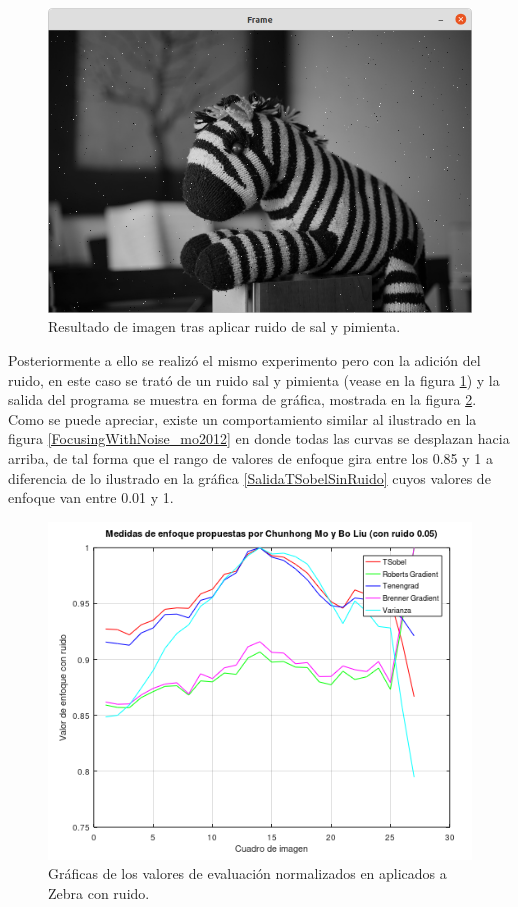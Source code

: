 \begin{figure}
\centering
\includegraphics[width=\textwidth]{GraficosExperimentacion/CebraConRuidoFOCUS.png}
\caption{Resultado de imagen tras aplicar ruido de sal y pimienta.}
\label{cebraRuido}
\end{figure}

Posteriormente a ello se realizó el mismo experimento pero con la adición del ruido, en este caso se trató de un ruido sal y pimienta (vease en la figura \ref{cebraRuido}) y la salida del programa se muestra en forma de gráfica, mostrada en la figura \ref{SalidaTSobelConRuido}. Como se puede apreciar, existe un comportamiento similar al ilustrado en la figura \ref{FocusingWithNoise_mo2012} en donde todas las curvas se desplazan hacia arriba, de tal forma que el rango de valores de enfoque gira entre los 0.85 y 1 a diferencia de lo ilustrado en la gráfica \ref{SalidaTSobelSinRuido} cuyos valores de enfoque van entre 0.01 y 1.

 
\begin{figure}
\centering
\includegraphics[width=\textwidth]{GraficosExperimentacion/sobelRuido.PNG}
\caption{Gráficas de los valores de evaluación normalizados en \citet{Mo2012} aplicados a Zebra con ruido. }
\label{SalidaTSobelConRuido}
\end{figure}



